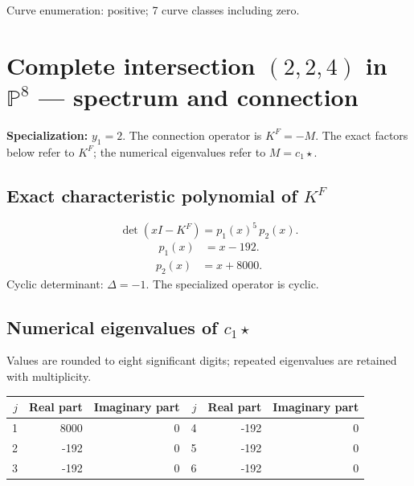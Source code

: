 \documentclass[10pt,a4paper]{article}
\begin{document}
Curve enumeration: positive; 7 curve classes including zero.
\clearpage\section*{Complete intersection $(2,2,4)$ in $\mathbb P^{8}$ --- spectrum and connection}
\textbf{Specialization:} $y_1=2$. The connection operator is $K^F=-M$. The exact factors below refer to $K^F$; the numerical eigenvalues refer to $M=c_1\star$.
\subsection*{Exact characteristic polynomial of $K^F$}
\[\det(xI-K^F)=p_{1}(x)^{5}\,p_{2}(x).\]
\[\begin{aligned}p_{1}(x)&=x - 192.\end{aligned}\]
\[\begin{aligned}p_{2}(x)&=x + 8000.\end{aligned}\]
Cyclic determinant: $\Delta=-1$. The specialized operator is cyclic.
\subsection*{Numerical eigenvalues of $c_1\star$}
Values are rounded to eight significant digits; repeated eigenvalues are retained with multiplicity.
\begin{center}\small\begin{tabular}{rrr@{\qquad}rrr}\toprule $j$ & Real part & Imaginary part & $j$ & Real part & Imaginary part\\\midrule
1 & 8000 & 0 & 4 & -192 & 0\\
2 & -192 & 0 & 5 & -192 & 0\\
3 & -192 & 0 & 6 & -192 & 0\\
\bottomrule\end{tabular}\end{center}
\end{document}
